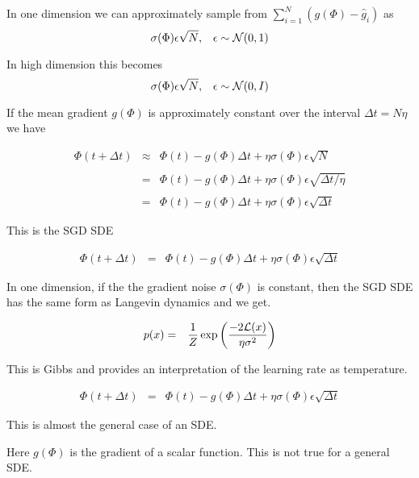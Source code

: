 {{\vfill
In one dimension we can approximately sample from $\sum_{i=1}^N (g(\Phi)- \hat{g}_i)$ as
$$\sigma(\Phi) \epsilon\sqrt{N},\;\;\;\epsilon \sim {\cal N}(0,1)$$

\vfill
In high dimension this becomes
$$\sigma(\Phi) \epsilon\sqrt{N},\;\;\;\epsilon \sim {\cal N}(0,I)$$
}


If the mean gradient $g(\Phi)$ is approximately constant over the interval $\Delta t = N \eta$ we have

\begin{eqnarray*}
\Phi(t + \Delta t)  & \approx & \Phi(t) -g(\Phi)\Delta t + \eta \sigma(\Phi) \epsilon\sqrt{N} \\
\\
& = & \Phi(t) -g(\Phi)\Delta t + \eta \sigma(\Phi) \epsilon\sqrt{\Delta t/\eta} \\
\\
& = & \Phi(t) -g(\Phi)\Delta t + \eta \sigma(\Phi) \epsilon\sqrt{\Delta t}
\end{eqnarray*}

\vfill
This is the SGD SDE


\begin{eqnarray*}
\Phi(t + \Delta t) & = & \Phi(t) -g(\Phi)\Delta t + \eta \sigma(\Phi) \epsilon\sqrt{\Delta t}
\end{eqnarray*}

In one dimension, if the the gradient noise $\sigma(\Phi)$ is constant, then the SGD SDE has the same form as Langevin dynamics and we get.

\begin{eqnarray*}
p(x) & = & \frac{1}{Z} \exp\left(\frac{-2{\cal L}(x)}{ \eta \sigma^2}\right)
\end{eqnarray*}

This is Gibbs and provides an interpretation of the learning rate as temperature.



\begin{eqnarray*}
\Phi(t + \Delta t) & = & \Phi(t) -g(\Phi)\Delta t + \eta \sigma(\Phi) \epsilon\sqrt{\Delta t}
\end{eqnarray*}

\vfill
This is almost the general case of an SDE.

\vfill
Here $g(\Phi)$ is the gradient of a scalar function.  This is not true for a general SDE.

}
